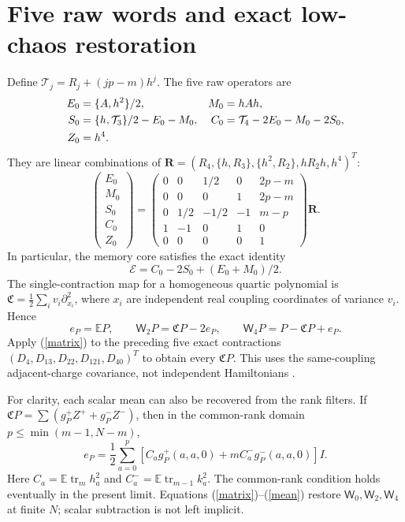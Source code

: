 \documentclass[11pt,a4paper]{article}
\newcommand{\EE}{\mathbb E}
\newcommand{\tr}{\operatorname{tr}}
\newcommand{\W}[1]{\mathsf W_{#1}}
\newcommand{\core}{\mathcal E}
\begin{document}
\newpage
\section{Five raw words and exact low-chaos restoration}
Define $\mathcal T_j=R_j+(jp-m)h^j$. The five raw operators are
\begin{align}
 E_0&=\{A,h^2\}/2,&M_0&=hAh,\notag\\
 S_0&=\{h,\mathcal T_3\}/2-E_0-M_0,
 &C_0&=\mathcal T_4-2E_0-M_0-2S_0,\\
 Z_0&=h^4.\notag
\end{align}
They are linear combinations of
$\mathbf R=(R_4,\{h,R_3\},\{h^2,R_2\},hR_2h,h^4)^T$:
\begin{equation}
 \begin{pmatrix}E_0\\M_0\\S_0\\C_0\\Z_0\end{pmatrix}
 =\begin{pmatrix}
 0&0&1/2&0&2p-m\\
 0&0&0&1&2p-m\\
 0&1/2&-1/2&-1&m-p\\
 1&-1&0&1&0\\
 0&0&0&0&1
 \end{pmatrix}\mathbf R.\label{matrix}
\end{equation}
In particular, the memory core satisfies the exact identity
\begin{equation}
 \core=C_0-2S_0+(E_0+M_0)/2.
\end{equation}
The single-contraction map for a homogeneous quartic polynomial is
$\mathfrak C=\frac12\sum_i v_i\partial_{x_i}^2$, where $x_i$ are
independent real coupling coordinates of variance $v_i$. Hence
\begin{equation}
 e_P=\EE P,\qquad \W2P=\mathfrak CP-2e_P,
 \qquad \W4P=P-\mathfrak CP+e_P.\label{chaos}
\end{equation}
Apply (\ref{matrix}) to the preceding five exact contractions
$(D_4,D_{13},D_{22},D_{121},D_{40})^T$ to obtain every
$\mathfrak CP$. This uses the same-coupling adjacent-charge
covariance, not independent Hamiltonians \cite{kota,local}.

For clarity, each scalar mean can also be recovered from the rank
filters. If $\mathfrak CP=\sum(g_P^+Z^++g_P^-Z^-)$, then in the
common-rank domain $p\leq\min(m-1,N-m)$,
\begin{equation}
 e_P=\frac12\sum_{a=0}^p
 \left[C_a g_P^+(a,a,0)+mC_a^-g_P^-(a,a,0)\right]I.\label{mean}
\end{equation}
Here $C_a=\EE\tr_m h_a^2$ and $C_a^-=\EE\tr_{m-1}k_a^2$.
The common-rank condition holds eventually in the present limit.
Equations (\ref{matrix})--(\ref{mean}) restore $\W0,\W2,\W4$
at finite $N$; scalar subtraction is not left implicit.
\end{document}
